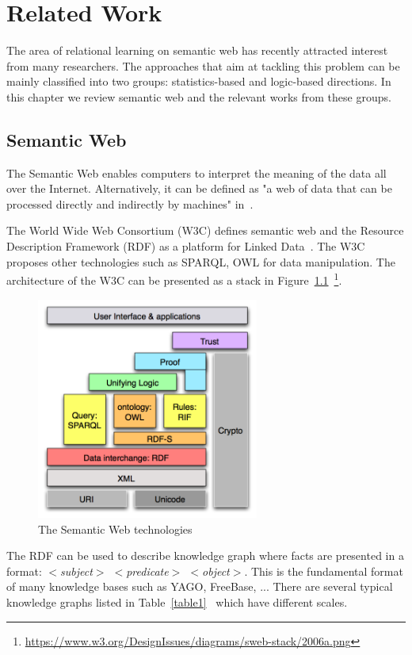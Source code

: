 \chapter{Related Work}

The area of relational learning on semantic web has recently attracted interest from many researchers. The approaches that aim at tackling this problem can be mainly classified into two groups: statistics-based and logic-based directions. In this chapter we review semantic web and the relevant works from these groups.

\section{Semantic Web}

The Semantic Web enables computers to interpret the meaning of the data all over the Internet. Alternatively, it can be defined as "a web of data that can be processed directly and indirectly by machines" in~\cite{ref26}.

The World Wide Web Consortium (W3C) defines semantic web and the Resource Description Framework (RDF) as a platform for Linked Data~\cite{ref26}. The W3C proposes other technologies such as SPARQL, OWL for data manipulation. The architecture of the W3C can be presented as a stack in Figure~\ref{fig1}~\footnote{\url{https://www.w3.org/DesignIssues/diagrams/sweb-stack/2006a.png}}.

\begin{figure}
\centering
\includegraphics[width=0.65\textwidth]{semantic-web.png}
\caption{The Semantic Web technologies}
\label{fig1}
\end{figure}

The RDF can be used to describe knowledge graph where facts are presented in a format: \textit{$<$subject$>$ $<$predicate$>$ $<$object$>$}. This is the fundamental format of many knowledge bases such as YAGO, FreeBase, ... There are several typical knowledge graphs listed in Table~\ref{table1}~\cite{ref27} which have different scales.


